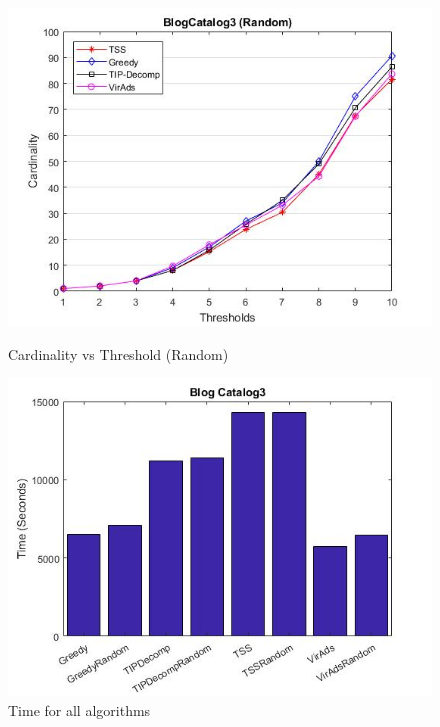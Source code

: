 \begin{figure}[h!]
\begin{minipage}[t]{0.50\textwidth}
\includegraphics[width=\linewidth,keepaspectratio=true]{images/bc3resultrandom.jpg}
\caption{Cardinality vs Threshold (Random)}

\end{minipage}
\begin{minipage}[t]{0.50\textwidth}
\includegraphics[width=\linewidth,keepaspectratio=true]{images/bc3time1.jpg}
\caption{Time for all algorithms}
\end{minipage}
\end{figure}

